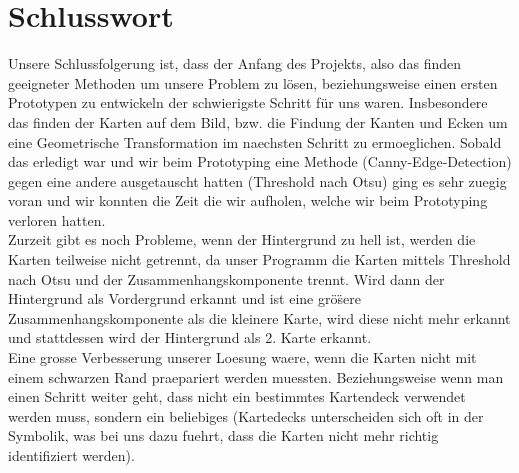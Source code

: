 \documentclass[paper=A4, deutsch]{scrartcl}
\begin{document}
\section{Schlusswort}
Unsere Schlussfolgerung ist, dass der Anfang des Projekts, also das finden geeigneter Methoden um unsere Problem zu lösen,
beziehungsweise einen ersten Prototypen zu entwickeln der schwierigste Schritt für uns waren. Insbesondere das finden der Karten
auf dem Bild, bzw. die Findung der Kanten und Ecken um eine Geometrische Transformation im naechsten Schritt zu ermoeglichen.
Sobald das erledigt war und wir beim Prototyping eine Methode (Canny-Edge-Detection) gegen eine andere ausgetauscht hatten (Threshold nach Otsu)
ging es sehr zuegig voran und wir konnten die Zeit die wir aufholen, welche wir beim Prototyping verloren hatten.\\
Zurzeit gibt es noch Probleme, wenn der Hintergrund zu hell ist, werden die Karten teilweise nicht getrennt,
da unser Programm die Karten mittels Threshold nach Otsu und der Zusammenhangskomponente trennt. Wird 
dann der Hintergrund als Vordergrund erkannt und ist eine gr\"o\"sere Zusammenhangskomponente als die kleinere Karte, wird diese nicht mehr erkannt
und stattdessen wird der Hintergrund als 2. Karte erkannt.\\
Eine grosse Verbesserung unserer Loesung waere, wenn die Karten nicht mit einem schwarzen Rand
praepariert werden muessten. Beziehungsweise wenn man einen Schritt weiter geht, dass nicht ein
bestimmtes Kartendeck verwendet werden muss, sondern ein beliebiges (Kartedecks unterscheiden sich oft
in der Symbolik, was bei uns dazu fuehrt, dass die Karten nicht mehr richtig identifiziert werden).



\end{document}

